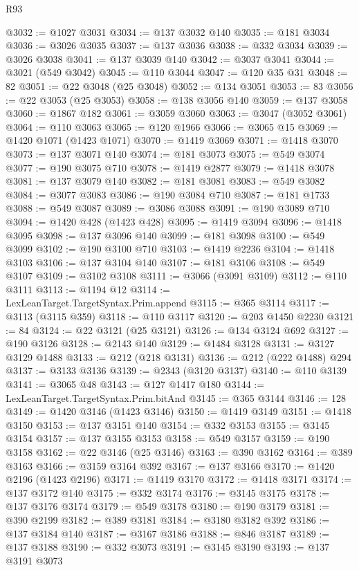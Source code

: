 \begin{lexlean}{R93}
\begin{coremodule}
@3032 := @1027 @3031
@3034 := @137 @3032 @140
@3035 := @181 @3034
@3036 := @3026 @3035
@3037 := @137 @3036
@3038 := @332 @3034
@3039 := @3026 @3038
@3041 := @137 @3039 @140
@3042 := @3037 @3041
@3044 := @3021 (@549 @3042)
@3045 := @110 @3044
@3047 := @120 @35 @31
@3048 := 82
@3051 := @22 @3048 (@25 @3048)
@3052 := @134 @3051
@3053 := 83
@3056 := @22 @3053 (@25 @3053)
@3058 := @138 @3056 @140
@3059 := @137 @3058
@3060 := @1867 @182
@3061 := @3059 @3060
@3063 := @3047 (@3052 @3061)
@3064 := @110 @3063
@3065 := @120 @1966
@3066 := @3065 @15
@3069 := @1420 @1071 (@1423 @1071)
@3070 := @1419 @3069
@3071 := @1418 @3070
@3073 := @137 @3071 @140
@3074 := @181 @3073
@3075 := @549 @3074
@3077 := @190 @3075 @710
@3078 := @1419 @2877
@3079 := @1418 @3078
@3081 := @137 @3079 @140
@3082 := @181 @3081
@3083 := @549 @3082
@3084 := @3077 @3083
@3086 := @190 @3084 @710
@3087 := @181 @1733
@3088 := @549 @3087
@3089 := @3086 @3088
@3091 := @190 @3089 @710
@3094 := @1420 @428 (@1423 @428)
@3095 := @1419 @3094
@3096 := @1418 @3095
@3098 := @137 @3096 @140
@3099 := @181 @3098
@3100 := @549 @3099
@3102 := @190 @3100 @710
@3103 := @1419 @2236
@3104 := @1418 @3103
@3106 := @137 @3104 @140
@3107 := @181 @3106
@3108 := @549 @3107
@3109 := @3102 @3108
@3111 := @3066 (@3091 @3109)
@3112 := @110 @3111
@3113 := @1194 @12
@3114 := LexLeanTarget.TargetSyntax.Prim.append
@3115 := @365 @3114
@3117 := @3113 (@3115 @359)
@3118 := @110 @3117
@3120 := @203 @1450 @2230
@3121 := 84
@3124 := @22 @3121 (@25 @3121)
@3126 := @134 @3124 @692
@3127 := @190 @3126
@3128 := @2143 @140
@3129 := @1484 @3128
@3131 := @3127 @3129 @1488
@3133 := @212 (@218 @3131)
@3136 := @212 (@222 @1488) @294
@3137 := @3133 @3136
@3139 := @2343 (@3120 @3137)
@3140 := @110 @3139
@3141 := @3065 @48
@3143 := @127 @1417 @180
@3144 := LexLeanTarget.TargetSyntax.Prim.bitAnd
@3145 := @365 @3144
@3146 := 128
@3149 := @1420 @3146 (@1423 @3146)
@3150 := @1419 @3149
@3151 := @1418 @3150
@3153 := @137 @3151 @140
@3154 := @332 @3153
@3155 := @3145 @3154
@3157 := @137 @3155 @3153
@3158 := @549 @3157
@3159 := @190 @3158
@3162 := @22 @3146 (@25 @3146)
@3163 := @390 @3162
@3164 := @389 @3163
@3166 := @3159 @3164 @392
@3167 := @137 @3166
@3170 := @1420 @2196 (@1423 @2196)
@3171 := @1419 @3170
@3172 := @1418 @3171
@3174 := @137 @3172 @140
@3175 := @332 @3174
@3176 := @3145 @3175
@3178 := @137 @3176 @3174
@3179 := @549 @3178
@3180 := @190 @3179
@3181 := @390 @2199
@3182 := @389 @3181
@3184 := @3180 @3182 @392
@3186 := @137 @3184 @140
@3187 := @3167 @3186
@3188 := @846 @3187
@3189 := @137 @3188
@3190 := @332 @3073
@3191 := @3145 @3190
@3193 := @137 @3191 @3073

\end{coremodule}
\end{lexlean}
